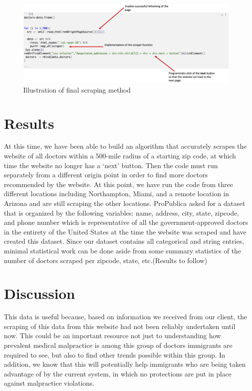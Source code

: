 \documentclass[10pt,letterpaper]{article}
\begin{document}
\begin{figure}
\includegraphics[width=1\linewidth]{final_scrape} \caption{Illustration of final scraping method}\label{fig:unnamed-chunk-4}
\end{figure}

\section{Results}\label{results}

At this time, we have been able to build an algorithm that accurately
scrapes the website of all doctors within a 500-mile radius of a
starting zip code, at which time the website no longer has a `next'
button. Then the code must run separately from a different origin point
in order to find more doctors recommended by the website. At this point,
we have run the code from three different locations including
Northampton, Miami, and a remote location in Arizona and are still
scraping the other locations. ProPublica asked for a dataset that is
organized by the following variables: name, address, city, state,
zipcode, and phone number which is representative of all the
government-approved doctors in the entirety of the United States at the
time the website was scraped and have created this dataset. Since our
dataset contains all categorical and string entries, minimal statistical
work can be done aside from some summary statistics of the number of
doctors scraped per zipcode, state, etc.(Results to follow)

\section{Discussion}\label{discussion}

This data is useful because, based on information we received from our
client, the scraping of this data from this website had not been
reliably undertaken until now. This could be an important resource not
just to understanding how prevalent medical malpractice is among this
group of doctors immigrants are required to see, but also to find other
trends possible within this group. In addition, we know that this will
potentially help immigrants who are being taken advantage of by the
current system, in which no protections are put in place against
malpractice violations.
\end{document}

